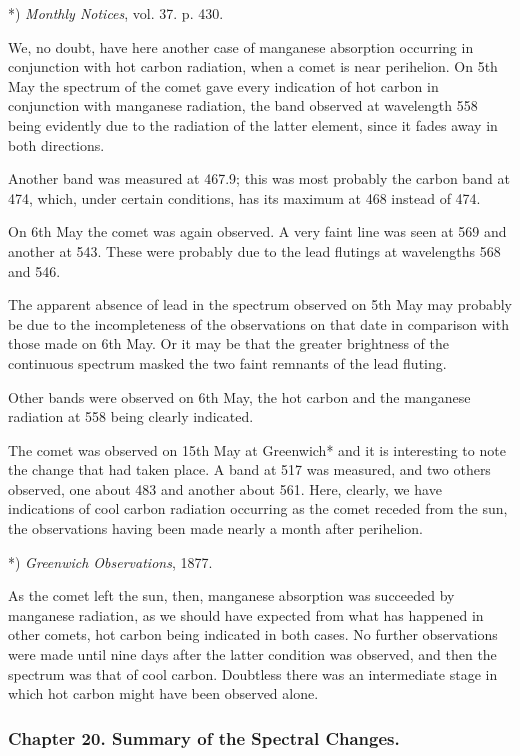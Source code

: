 \documentclass[a4paper, 12pt, oneside, polutonikogreek, english]{article}
\begin{document}
*) \emph{Monthly Notices}, vol. 37. p. 430.

We, no doubt, have here another case of manganese absorption occurring in conjunction with hot carbon radiation, when a comet is near perihelion. On 5th May the spectrum of the comet gave every indication of hot carbon in conjunction with manganese radiation, the band observed at wavelength 558 being evidently due to the radiation of the latter element, since it fades away in both directions.

Another band was measured at 467.9; this was most probably the carbon band at 474, which, under certain conditions, has its maximum at 468 instead of 474.

On 6th May the comet was again observed. A very faint line was seen at 569 and another at 543. These were probably due to the lead flutings at wavelengths 568 and 546.

The apparent absence of lead in the spectrum observed on 5th May may probably be due to the incompleteness of the observations on that date in comparison with those made on 6th May. Or it may be that the greater brightness of the continuous spectrum masked the two faint remnants of the lead fluting.

Other bands were observed on 6th May, the hot carbon and the manganese radiation at 558 being clearly indicated.

The comet was observed on 15th May at Greenwich* and it is interesting to note the change that had taken place. A band at 517 was measured, and two others observed, one about 483 and another about 561. Here, clearly, we have indications of cool carbon radiation occurring as the comet receded from the sun, the observations having been made nearly a month after perihelion.

*) \emph{Greenwich Observations}, 1877.

As the comet left the sun, then, manganese absorption was succeeded by manganese radiation, as we should have expected from what has happened in other comets, hot carbon being indicated in both cases. No further observations were made until nine days after the latter condition was observed, and then the spectrum was that of cool carbon. Doubtless there was an intermediate stage in which hot carbon might have been observed alone.

\subsubsection{Chapter 20. Summary of the Spectral Changes.}
\end{document}

